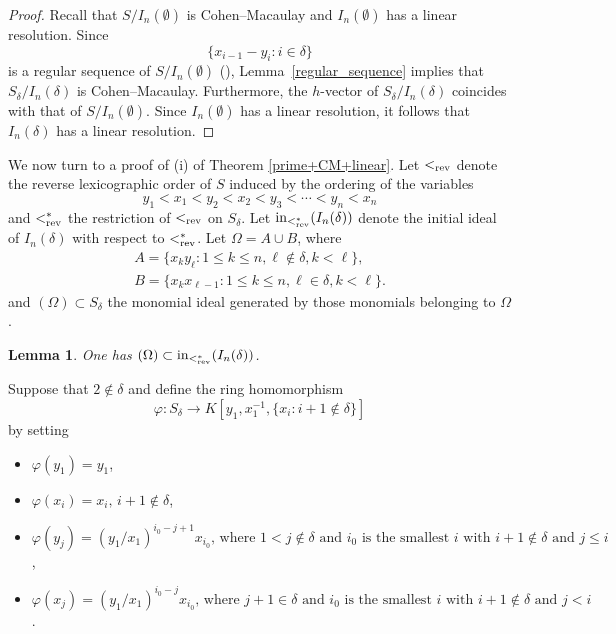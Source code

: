 \documentclass[12pt]{amsart}
\let\to=\rightarrow
\newtheorem{Lemma}[Theorem]{Lemma}
\begin{document}
\begin{proof}
Recall that $S/I_n(\emptyset)$ is Cohen--Macaulay and
$I_n(\emptyset)$ has a linear resolution. Since
\[
\{x_{i-1}-y_i:i\in\delta\}
\]
is a regular sequence of $S/I_n(\emptyset)$
(\cite[Theorem~4.1]{Eis}), Lemma~\ref{regular_sequence} implies that
$S_\delta/I_n(\delta)$ is Cohen--Macaulay. Furthermore, the $h$-vector of $S_\delta/I_n(\delta)$ coincides with
that of $S/I_n(\emptyset)$. Since $I_n(\emptyset)$ has a linear
resolution, it follows that $I_n(\delta)$ has a linear resolution.
\end{proof}


We now turn to a proof of (i) of Theorem \ref{prime+CM+linear}.
Let $<_{\rm rev}$ denote the reverse lexicographic order of $S$ induced by the ordering of the variables 
\[
y_1 < x_1 < y_2 < x_2 < y_3 < \cdots < y_{n} < x_n
\]
and $<_{\rm rev}^*$ the restriction of $<_{\rm rev}$ on $S_\delta$.  Let ${\rm in}_{<_{\rm rev}^*}(I_n(\delta))$ denote the initial ideal of $I_n(\delta)$ with respect to $<_{\rm rev}^*$.  Let $\Omega=A \cup B$, where 
    \begin{eqnarray*}
&A=\{x_k y_\ell:1 \leq k \leq n, \ell \not\in \delta, k < \ell\},& \\
&B=\{x_k x_{\ell-1}:1 \leq k \leq n, \ell \in \delta, k < \ell\}.&
    \end{eqnarray*}
and $(\Omega) \subset S_\delta$ the monomial ideal generated by those monomials belonging to $\Omega$.
\begin{Lemma}
    One has $(\Omega) \subset {\rm in}_{<_{\rm rev}^*}(I_n(\delta))$.
\end{Lemma}

Suppose that $2 \not\in \delta$ and define the ring homomorphism $$\varphi:S_\delta \to K[y_1,x_1^{-1}, \{x_i: i+1 \not\in \delta\}]$$ by setting
\begin{itemize}
    \item 
    $\varphi(y_1)=y_1$,
    \item 
    $\varphi(x_i)=x_i, \, i+1 \not\in \delta$,
    \item 
    $\varphi(y_j)=(y_1/x_1)^{i_0-j+1}x_{i_0}, \, \text{where $1 < j \not\in \delta$ and $i_0$ is the smallest $i$ with $i+1 \not\in \delta$ and  $j \leq i$}$,
    \item
    $\varphi(x_j)=(y_1/x_1)^{i_0-j}x_{i_0}, \, \text{where $j+1 \in \delta$ and $i_0$ is the smallest $i$ with $i+1 \not\in \delta$ and  $j < i$}$.
\end{itemize}
\end{document}
